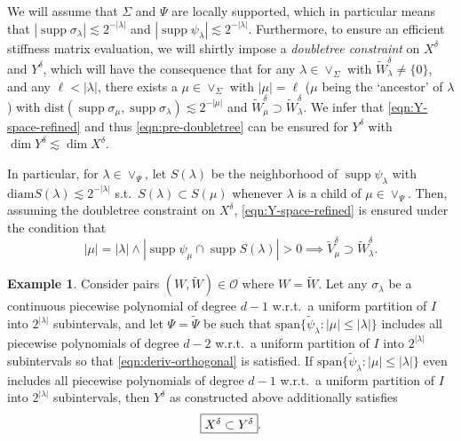 \documentclass[11pt,a4paper,oneside,english]{amsart}
\numberwithin{equation}{section}
\numberwithin{theorem}{section}
\theoremstyle{definition}
\newtheorem{example}[theorem]{Example}
\DeclareMathOperator{\supp}{supp}
\providecommand{\spann}{\mathrm{span}}
\providecommand{\diam}{\mathrm{diam}}
\providecommand{\dist}{\mathrm{dist}}
\newcommand{\jw}[1]{{\color{red}{JW: #1}}}
\begin{document}
We will assume that $\Sigma$ and $\Psi$ are locally supported, which in particular
means that $|\supp \sigma_\lambda| \lesssim 2^{-|\lambda|}$ and
$|\supp \psi_\lambda| \lesssim 2^{-|\lambda|}$. Furthermore, to ensure an
efficient stiffness matrix evaluation, we will shirtly impose a \emph{doubletree constraint}
on $X^\delta$ and $Y^\delta$, which will have the consequence that for any
$\lambda \in \vee_\Sigma$ with $\tilde{W}_\lambda^\delta \neq \{0\}$, and any
$\ell <|\lambda|$, there exists a $\mu \in \vee_\Sigma$ with $|\mu|=\ell$
($\mu$ being the `ancestor' of $\lambda$) with
$\dist(\supp \sigma_\mu,\supp \sigma_\lambda)\lesssim 2^{-|\mu|}$ and
$\tilde{W}_\mu^\delta \supset \tilde{W}_\lambda^\delta$.
We infer that \eqref{eqn:Y-space-refined} and thus \eqref{eqn:pre-doubletree} can
be ensured for $Y^\delta$ with $\dim Y^\delta \lesssim \dim X^\delta$.

In particular, for $\lambda \in \vee_\Psi$, let $S(\lambda)$ be the neighborhood
of $\supp \psi_\lambda$ with $\diam S(\lambda) \lesssim 2^{-|\lambda|}$ s.t.~$S(\lambda) \subset S(\mu)$
whenever $\lambda$ is a child of $\mu \in \vee_\Psi$. Then, assuming the doubletree
constraint on $X^\delta$, \eqref{eqn:Y-space-refined} is ensured under the condition
that
\[
  |\mu| = |\lambda| \wedge|\supp \psi_\mu \cap \supp S(\lambda)|>0 \implies \tilde{V}^\delta_\mu \supset  \tilde{W}^\delta_\lambda.
\]
\jw{Dit is min-of-meer copy-paste uit followup maar ik vind het nu nog wel cryptisch :-(}

\begin{example}
  Consider pairs $(W, \tilde W) \in \mathcal O$ where $W = \tilde W$.
  Let any $\sigma_\lambda$ be a continuous piecewise polynomial of degree $d-1$\jw{voor $d$ de dimensie van je space domain?! of gewoon *een* $d$? in het tweede geval: rename naar $p$?}
  w.r.t.~a uniform partition of $I$ into $2^{|\lambda|}$ subintervals, and let 
  $\Psi=\tilde{\Psi}$ be such that $\spann\{\tilde{\psi}_\lambda : |\mu| \leq |\lambda|\}$
  includes all piecewise polynomials of degree $d-2$ w.r.t.~a uniform partition
  of $I$ into $2^{|\lambda|}$ subintervals so that \eqref{eqn:deriv-orthogonal}
  is satisfied. If $\spann\{\tilde{\psi}_\lambda : |\mu| \leq |\lambda|\}$ even
  includes all piecewise polynomials of degree $d-1$ w.r.t.~a uniform partition
  of $I$ into $2^{|\lambda|}$ subintervals, then $Y^\delta$ as constructed above
  additionally satisfies
  \begin{equation}
    \label{eqn:inclusion}
      \framebox{$X^\delta \subset Y^\delta$}.
  \end{equation}
\end{example}
\end{document}
